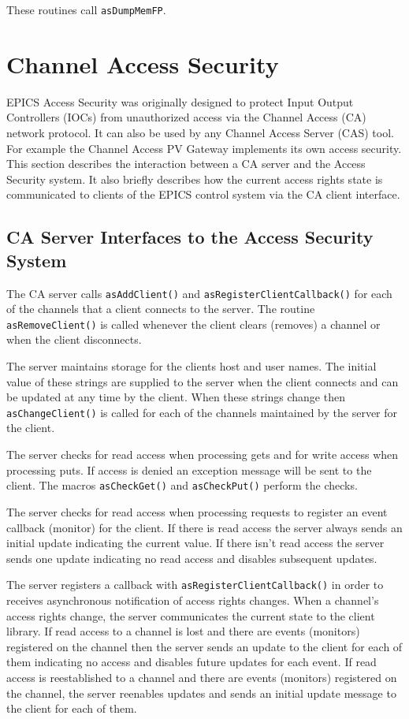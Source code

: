 These routines call \verb|asDumpMemFP|.

\section{Channel Access Security}

EPICS Access Security was originally designed to protect Input Output Controllers (IOCs) from unauthorized access via the Channel Access (CA) network protocol.
It can also be used by any Channel Access Server (CAS) tool.
For example the Channel Access PV Gateway implements its own access security.
This section describes the interaction between a CA server and the Access Security system.
It also briefly describes how the current access rights state is communicated to clients of the EPICS control system via the CA client interface.

\subsection{CA Server Interfaces to the Access Security System}

The CA server calls \verb|asAddClient()| and \verb|asRegisterClientCallback()| for each of the channels that a client connects to the server.
The routine \verb|asRemoveClient()| is called whenever the client clears (removes) a channel or when the client disconnects.

The server maintains storage for the clients host and user names.
The initial value of these strings are supplied to the server when the client connects and can be updated at any time by the client.
When these strings change then \verb|asChangeClient()| is called for each of the channels maintained by the server for the client.

The server checks for read access when processing gets and for write access when processing puts.
If access is denied an exception message will be sent to the client.
The macros \verb|asCheckGet()| and \verb|asCheckPut()| perform the checks.

The server checks for read access when processing requests to register an event callback (monitor) for the client.
If there is read access the server always sends an initial update indicating the current value.
If there isn't read access the server sends one update indicating no read access and disables subsequent updates.

The server  registers a callback with \verb|asRegisterClientCallback()| in order to receives asynchronous notification of access rights changes.
When a channel's access rights change, the server communicates the current state to the client library.
If read access to a channel is lost and there are events (monitors) registered on the channel then the server sends an update to the client for each of them indicating no access and disables future updates for each event.
If read access is reestablished to a channel and there are events (monitors) registered on the channel, the server reenables updates and sends an initial update message to the client for each of them.

